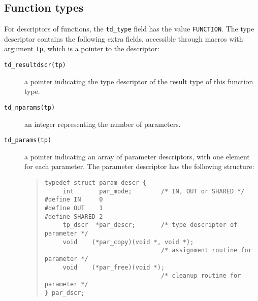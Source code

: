 \documentclass[10pt]{article}
\begin{document}
\subsection{Function types}
For descriptors of functions, the \verb+td_type+
field has the value \verb+FUNCTION+.
The type descriptor contains the following extra fields, accessible through
macros with argument \verb+tp+, which is a pointer to the descriptor:
\begin{description}
\item[{\tt td\_resultdscr(tp)}]
a pointer indicating the type descriptor of the result type
of this function type.
\item[{\tt td\_nparams(tp)}]
an integer representing the number of parameters.
\item[{\tt td\_params(tp)}]
a pointer indicating an array of parameter descriptors,
with one element for each parameter.
The parameter descriptor has the following structure:
\begin{quote}
\begin{verbatim}
typedef struct param_descr {
     int       par_mode;        /* IN, OUT or SHARED */
#define IN     0
#define OUT    1
#define SHARED 2
     tp_dscr  *par_descr;       /* type descriptor of parameter */
     void    (*par_copy)(void *, void *);
                                /* assignment routine for parameter */
     void    (*par_free)(void *);
                                /* cleanup routine for parameter */
} par_dscr;
\end{verbatim}
\end{quote}
\end{description}
\end{document}
